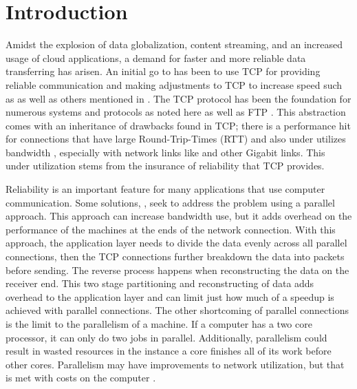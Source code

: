 \chapter{Introduction}

Amidst the explosion of data globalization, content streaming, and an increased usage of cloud applications, a demand for faster and more reliable data transferring has arisen. An initial go to has been to use TCP for providing reliable communication and making adjustments to TCP to increase speed such as \cite{brakmo1995tcp}\cite{wei2006fast}\cite{ha2008cubic} as well as others mentioned in \cite{ha2008cubic}\cite{He2002}. The TCP protocol has been the foundation for numerous systems and protocols as noted here \cite{Fan2010} as well as FTP \cite{Bhushan1972}. This abstraction comes with an inheritance of drawbacks found in TCP; there is a performance hit for connections that have large Round-Trip-Times (RTT) and also under utilizes bandwidth \cite{Fan2010}, especially with network links like \cite{Pfister2001} and other Gigabit links. This under utilization stems from the insurance of reliability that TCP provides.

Reliability is an important feature for many applications that use computer communication. Some solutions, \cite{Allman1995}\cite{Allman1997}\cite{Sivakumar2000psockets}, seek to address the problem using a parallel approach. This approach can increase bandwidth use, but it adds overhead on the performance of the machines at the ends of the network connection. With this approach, the application layer needs to divide the data evenly across all parallel connections, then the TCP connections further breakdown the data into packets before sending. The reverse process happens when reconstructing the data on the receiver end. This two stage partitioning and reconstructing of data adds overhead to the application layer and can limit just how much of a speedup is achieved with parallel connections. The other shortcoming of parallel connections is the limit to the parallelism of a machine. If a computer has a two core processor, it can only do two jobs in parallel. Additionally, parallelism could result in wasted resources in the instance a core finishes all of its work before other cores. Parallelism may have improvements to network utilization, but that is met with costs on the computer \cite{Leijen2009}.

